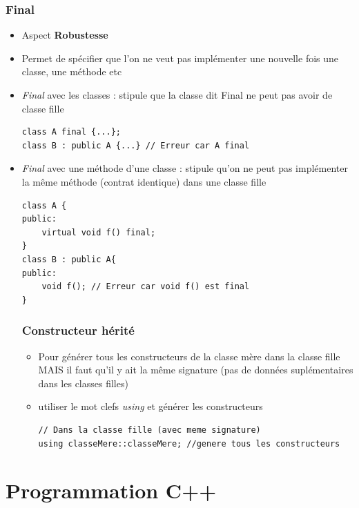 \documentclass[12pt,a4paper]{article}
\begin{document}
\subsubsection{Final}
\begin{itemize}
\item Aspect \textbf{Robustesse}
\item Permet de spécifier que l'on ne veut pas implémenter une nouvelle fois une classe, une méthode etc
\item \textit{Final} avec les classes : stipule que la classe dit Final ne peut pas avoir de classe fille
\begin{lstlisting}
class A final {...};
class B : public A {...} // Erreur car A final
\end{lstlisting}
\item \textit{Final} avec une méthode d'une classe : stipule qu'on ne peut pas implémenter la même méthode (contrat identique) dans une classe fille
\begin{lstlisting}
class A {
public:
	virtual void f() final;
}
class B : public A{
public:
	void f(); // Erreur car void f() est final
}
\end{lstlisting}
\subsubsection{Constructeur hérité}
\begin{itemize}
\item Pour générer tous les constructeurs de la classe mère dans la classe fille MAIS il faut qu'il y ait la même signature (pas de données suplémentaires dans les classes filles)
\item utiliser le mot clefs \textit{using} et générer les constructeurs
\begin{lstlisting}
// Dans la classe fille (avec meme signature)
using classeMere::classeMere; //genere tous les constructeurs
\end{lstlisting}
\end{itemize}
\end{itemize}

\newpage
\section{Programmation C++}
\end{document}
